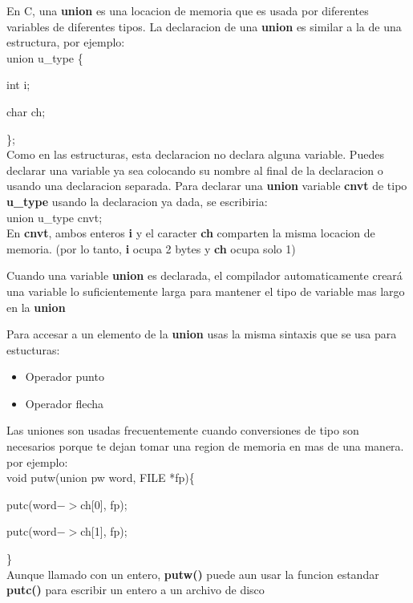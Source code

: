 \documentclass[]{article}
\begin{document}
			En C, una \textbf{union} es una locacion de memoria que es usada por diferentes variables de diferentes tipos. La declaracion de una \textbf{union} es similar a la de una estructura, por ejemplo:\\
			
			union u\_type \{
			
			int i;
			
			char ch;
			
			\};\\
			
			Como en las estructuras, esta declaracion no declara alguna variable. Puedes declarar una variable ya sea colocando su nombre al final de la declaracion o usando una declaracion separada. Para declarar una \textbf{union} variable \textbf{cnvt} de tipo \textbf{u\_type} usando la declaracion ya dada, se escribiria:\\
			
			union u\_type cnvt;\\
			
			En \textbf{cnvt}, ambos enteros \textbf{i} y el caracter \textbf{ch} comparten la misma locacion de memoria. (por lo tanto, \textbf{i} ocupa 2 bytes y \textbf{ch} ocupa solo 1)
			
			Cuando una variable \textbf{union} es declarada, el compilador automaticamente creará una variable lo suficientemente larga para mantener el tipo de variable mas largo en la \textbf{union}
			
			Para accesar a un elemento de la \textbf{union} usas la misma sintaxis que se usa para estucturas:\\ 
			
			\begin{itemize}
				\item Operador punto
				\item Operador flecha
			\end{itemize}
		
			Las uniones son usadas frecuentemente cuando conversiones de tipo son necesarios porque te dejan tomar una region de memoria en mas de una manera. por ejemplo:\\
			
			void putw(union pw word, FILE *fp)\{
			
			putc(word$->$ch[0], fp);
			
			putc(word$->$ch[1], fp);
			
			\}\\
			
			Aunque llamado con un entero, \textbf{putw()} puede aun usar la funcion estandar \textbf{putc()} para escribir un entero a un archivo de disco
			
\end{document}
